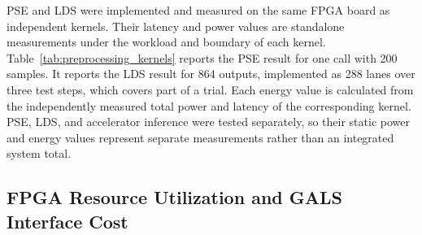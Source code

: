 \documentclass[12pt]{article}
\providecommand{\DIFaddtex}[1]{{\protect\color{blue}\sf #1}}
\providecommand{\DIFadd}[1]{\texorpdfstring{\DIFaddtex{#1}}{#1}}
\providecommand{\DIFaddbegin}{}
\providecommand{\DIFaddend}{}
\providecommand{\DIFaddFL}[1]{\DIFadd{#1}}
\providecommand{\DIFaddbeginFL}{}
\providecommand{\DIFaddendFL}{}
\begin{document}
\DIFadd{PSE and LDS were implemented and measured on the same FPGA board as independent kernels. Their latency and power values are standalone measurements under the workload and boundary of each kernel. Table~\ref{tab:preprocessing_kernels} reports the PSE result for one call with 200 samples. It reports the LDS result for 864 outputs, implemented as 288 lanes over three test steps, which covers part of a trial. Each energy value is calculated from the independently measured total power and latency of the corresponding kernel. PSE, LDS, and accelerator inference were tested separately, so their static power and energy values represent separate measurements rather than an integrated system total.
}

\begin{table}[!htbp]
\centering
\DIFaddendFL \caption{ \DIFaddbeginFL \DIFaddFL{Standalone FPGA measurements of preprocessing kernels at board level. PSE, LDS, and }\DIFaddendFL the  \DIFaddbeginFL \DIFaddFL{GALS accelerator were tested independently, and each power and energy value retains its own measurement boundary}\DIFaddendFL . \DIFaddbeginFL \DIFaddFL{Power components were rounded independently.}\DIFaddendFL }
 \DIFaddbeginFL \label{tab:preprocessing_kernels}
\scriptsize
\renewcommand{\arraystretch}{1.15}
\setlength{\tabcolsep}{2.3pt}
\DIFaddendFL \end{table}

\subsection{FPGA Resource Utilization \DIFaddbegin \DIFadd{and GALS Interface Cost}\DIFaddend }
\end{document}
